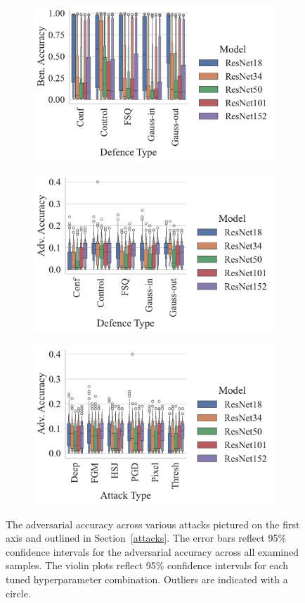 \label{results}
\begin{figure}[!h]
\centering
\begin{subfigure}
    \centering
    \includegraphics[trim={7pt 10pt 20pt 0pt},clip,width=.40\textwidth]{plots/ben_accuracy_vs_defence_type.pdf}
\end{subfigure}
\begin{subfigure}
    \centering
    \includegraphics[trim={7pt 10pt 20pt pt 0pt},clip,width=.40\textwidth]{plots/adv_accuracy_vs_defence_type.pdf}
\end{subfigure}
\begin{subfigure}
    \centering
    \includegraphics[trim={7pt 10pt 20pt pt 0pt},clip,width=.40\textwidth]{plots/adv_accuracy_vs_attack_type.pdf}
\end{subfigure}
\caption{The adversarial accuracy across various attacks pictured on the first axis and outlined in Section~\ref{attacks}. The error bars reflect 95\% confidence intervals for the adversarial accuracy across all examined samples. The violin plots reflect 95\% confidence intervals for each tuned hyperparameter combination. Outliers are indicated with a circle.}
\label{fig:accuracies}
\end{figure}



